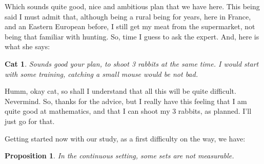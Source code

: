 \documentclass[12pt]{amsbook}
\newtheorem{cat}[theorem]{Cat}
\newtheorem{proposition}[theorem]{Proposition}
\begin{document}
\bigskip

Which sounds quite good, nice and ambitious plan that we have here. This being said I must admit that, although being a rural being for years, here in France, and an Eastern European before, I still get my meat from the supermarket, not being that familiar with hunting. So, time I guess to ask the expert. And, here is what she says:

\begin{cat}
Sounds good your plan, to shoot 3 rabbits at the same time. I would start with some training, catching a small mouse would be not bad.
\end{cat}

Humm, okay cat, so shall I understand that all this will be quite difficult. Nevermind. So, thanks for the advice, but I really have this feeling that I am quite good at mathematics, and that I can shoot my 3 rabbits, as planned. I'll just go for that.

\bigskip

Getting started now with our study, as a first difficulty on the way, we have:

\begin{proposition}
In the continuous setting, some sets are not measurable.
\end{proposition}
\end{document}
